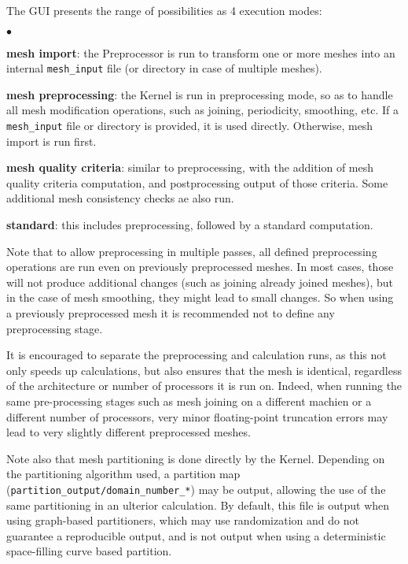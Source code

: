 {{{The GUI presents the range of possibilities as 4 execution modes:

\begin{list}{$\bullet$}{}

\item {\bf mesh import}: the Preprocessor is run to transform one or more meshes into an internal \texttt{mesh\_input} file (or directory in case of multiple meshes).

\item {\bf mesh preprocessing}: the Kernel is run in preprocessing mode, so as to handle all mesh modification operations, such as joining, periodicity, smoothing, etc. If a \texttt{mesh\_input} file or directory is provided, it is used directly. Otherwise, mesh import is run first.

\item {\bf mesh quality criteria}: similar to preprocessing, with the addition of mesh quality criteria computation, and postprocessing output of those criteria. Some additional mesh consistency checks ae also run.

\item {\bf standard}: this includes preprocessing, followed by a standard computation.

\end{list}

Note that to allow preprocessing in multiple passes, all defined preprocessing operations are run even on previously preprocessed meshes. In most cases, those will not produce additional changes (such as joining already joined meshes), but in the case of mesh smoothing, they might lead to small changes. So when using a previously preprocessed mesh it is recommended not to define any preprocessing stage.

It is encouraged to separate the preprocessing and calculation runs, as
this not only speeds up calculations, but also ensures that the mesh is identical, regardless of the architecture or number of processors it is run on. Indeed, when running the same pre-processing stages such as mesh joining on a different machien or a different number of processors, very minor floating-point truncation errors may lead to very slightly different preprocessed meshes.

Note also that mesh partitioning is done directly by the Kernel. Depending on the partitioning algorithm used, a partition map (\texttt{partition\_output/domain\_number\_*}) may be output, allowing the use of the same partitioning in an ulterior calculation. By default, this file is output when using graph-based partitioners, which may use randomization and do not guarantee a reproducible output, and is not output when using a deterministic space-filling curve based partition.

}}}
